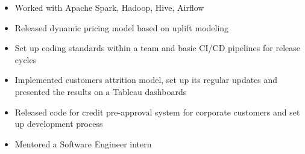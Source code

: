 \begin{itemize}
    \item Worked with Apache Spark, Hadoop, Hive, Airflow
    \item Released dynamic pricing model based on uplift modeling
    \item Set up coding standards within a team and basic CI/CD pipelines for release cycles
    \item Implemented customers attrition model, set up its regular updates and presented the results on a Tableau dashboards
    \item Released code for credit pre-approval system for corporate customers and set up development process
    \item Mentored a Software Engineer intern
\end{itemize}
